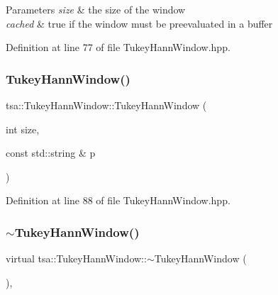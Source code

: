 \begin{DoxyParams}{Parameters}
{\em size} & the size of the window \\
\hline
{\em cached} & true if the window must be preevaluated in a buffer \\
\hline
\end{DoxyParams}


Definition at line 77 of file Tukey\+Hann\+Window.\+hpp.

\mbox{\label{classtsa_1_1_tukey_hann_window_ab883fbdd5791e0bbedede99126e17bf7}} 
\subsubsection{\texorpdfstring{Tukey\+Hann\+Window()}{TukeyHannWindow()}\hspace{0.1cm}{\footnotesize\ttfamily [2/2]}}
{\footnotesize\ttfamily tsa\+::\+Tukey\+Hann\+Window\+::\+Tukey\+Hann\+Window (\begin{DoxyParamCaption}\item[{int}]{size,  }\item[{const std\+::string \&}]{p }\end{DoxyParamCaption})\hspace{0.3cm}{\ttfamily [inline]}}



Definition at line 88 of file Tukey\+Hann\+Window.\+hpp.

\mbox{\label{classtsa_1_1_tukey_hann_window_af6b96cf901725bc0bcc7cf79bef2d766}} 
\subsubsection{\texorpdfstring{$\sim$\+Tukey\+Hann\+Window()}{~TukeyHannWindow()}}
{\footnotesize\ttfamily virtual tsa\+::\+Tukey\+Hann\+Window\+::$\sim$\+Tukey\+Hann\+Window (\begin{DoxyParamCaption}{ }\end{DoxyParamCaption})\hspace{0.3cm}{\ttfamily [inline]}, {\ttfamily [virtual]}}

